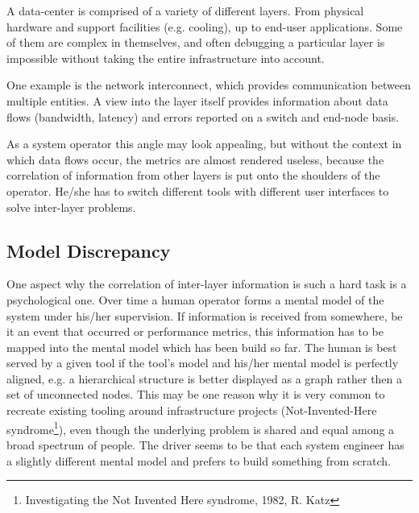 A data-center is comprised of a variety of different layers. From physical hardware and support facilities (e.g. cooling), up to end-user applications.
Some of them are complex in themselves, and often debugging a particular layer is impossible without taking the entire infrastructure into account.

One example is the network interconnect, which provides communication between multiple entities.
A view into the layer itself provides information about data flows (bandwidth, latency) and errors reported on a switch and end-node basis.

As a system operator this angle may look appealing, but without the context in which data flows occur, the metrics are almost rendered useless,
because the correlation of information from other layers is put onto the shoulders of the operator.
He/she has to switch different tools with different user interfaces to solve inter-layer problems.
\subsection{Model Discrepancy}
One aspect why the correlation of inter-layer information is such a hard task is a psychological one. Over time a human operator forms a mental model
of the system under his/her supervision. If information is received from somewhere, be it an event that occurred or performance metrics, this information
has to be mapped into the mental model which has been build so far.
The human is best served by a given tool if the tool's model and his/her mental model is perfectly aligned,
e.g. a hierarchical structure is better displayed as a graph rather then a set of unconnected nodes.
This may be one reason why it is very common to recreate existing tooling around infrastructure projects
(Not-Invented-Here syndrome\footnote{Investigating the Not Invented Here syndrome, 1982, R. Katz}), even though the underlying problem
is shared and equal among a broad spectrum of people. The driver seems to be that each system engineer has a slightly different mental
model and prefers to build something from scratch.


